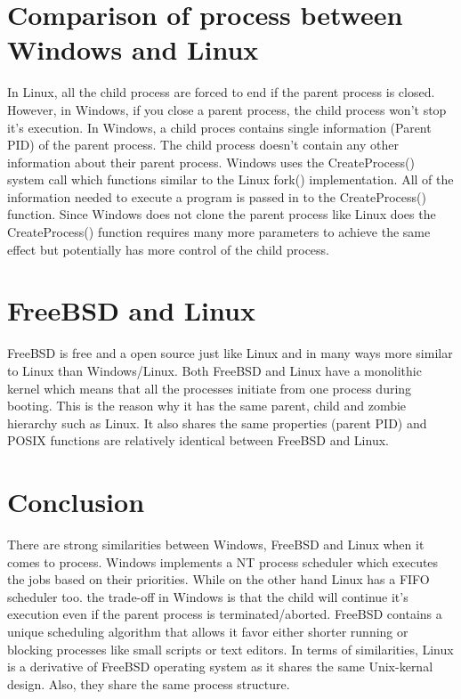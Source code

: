 \documentclass[letterpaper,10pt,titlepage]{IEEEtran}
\begin{document}
\section{Comparison of process between Windows and Linux}
In Linux, all the child process are forced to end if the parent process is closed. However, in Windows, if you close a parent process, the child process won't stop it's execution. In Windows, a child proces contains single information (Parent PID) of the parent process. The child process doesn't contain any other information about their parent process. \cite{process} Windows uses the CreateProcess() system call which functions similar to the Linux fork() implementation. All of the information needed to execute a program is passed in to the CreateProcess() function. Since Windows does not clone the parent process like Linux does the CreateProcess() function requires many more parameters to achieve the same effect but potentially has more control of the child process. \cite{Wini}

\section{FreeBSD and Linux}
FreeBSD is free and a open source just like Linux and in many ways more similar to Linux than Windows/Linux. Both FreeBSD and Linux have a monolithic kernel which means that all the processes initiate from one process during booting. This is the reason why it has the same parent, child and zombie hierarchy such as Linux. It also shares the same properties (parent PID) and POSIX functions are relatively identical between FreeBSD and Linux. \cite{freeBsdBook}

\section{Conclusion}
There are strong similarities between Windows, FreeBSD and Linux when it comes to process. Windows implements a NT process scheduler which executes the jobs based on their priorities. While on the other hand Linux has a FIFO scheduler too. the trade-off in Windows is that the child will continue it's execution even if the parent process is terminated/aborted. FreeBSD contains a unique scheduling algorithm that allows it favor either shorter running or blocking processes like small scripts or text editors. In terms of similarities, Linux is a derivative of FreeBSD operating system as it shares the same Unix-kernal design. Also, they share the same process structure.
   
  
\nocite{*}%


\end{document}
